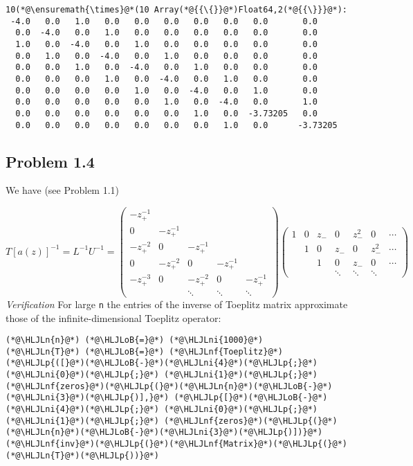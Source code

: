 \documentclass[12pt,landscape]{article}
\newcommand{\HLJLn}[1]{#1}
\newcommand{\HLJLnf}[1]{\textcolor[RGB]{66,102,213}{#1}}
\newcommand{\HLJLni}[1]{\textcolor[RGB]{59,151,46}{#1}}
\newcommand{\HLJLoB}[1]{\textcolor[RGB]{102,102,102}{\textbf{#1}}}
\newcommand{\HLJLp}[1]{#1}
\def\sopmatrix#1{ \begin{pmatrix}#1\end{pmatrix} }
\begin{document}
{\begin{lstlisting}
10(*@\ensuremath{\times}@*(10 Array(*@{{\{}}@*)Float64,2(*@{{\}}}@*):
 -4.0   0.0   1.0   0.0   0.0   0.0   0.0   0.0   0.0       0.0
  0.0  -4.0   0.0   1.0   0.0   0.0   0.0   0.0   0.0       0.0
  1.0   0.0  -4.0   0.0   1.0   0.0   0.0   0.0   0.0       0.0
  0.0   1.0   0.0  -4.0   0.0   1.0   0.0   0.0   0.0       0.0
  0.0   0.0   1.0   0.0  -4.0   0.0   1.0   0.0   0.0       0.0
  0.0   0.0   0.0   1.0   0.0  -4.0   0.0   1.0   0.0       0.0
  0.0   0.0   0.0   0.0   1.0   0.0  -4.0   0.0   1.0       0.0
  0.0   0.0   0.0   0.0   0.0   1.0   0.0  -4.0   0.0       1.0
  0.0   0.0   0.0   0.0   0.0   0.0   1.0   0.0  -3.73205   0.0
  0.0   0.0   0.0   0.0   0.0   0.0   0.0   1.0   0.0      -3.73205
\end{lstlisting}


\subsection{Problem 1.4}
We have (see Problem 1.1)

\[
T[a(z)]^{-1} = L^{-1} U^{-1} =
\sopmatrix{-z_+^{-1} \\
0 & -z_+^{-1} \\
-z_+^{-2} & 0 & -z_+^{-1} \\
0 & -z_+^{-2} & 0 & -z_+^{-1} \\
-z_+^{-3} & 0 & -z_+^{-2} & 0 & -z_+^{-1} \\
&&\ddots & \ddots & \ddots
}
\sopmatrix{
1 & 0 & z_- & 0 &z_-^2 & 0 & \cdots \\
& 1 & 0 & z_- & 0 &z_-^2 & \cdots \\
& & 1 & 0 & z_- & 0 & \cdots \\
&&&\ddots & \ddots & \ddots
}
\]
\emph{Verification} For large \texttt{n} the entries of the inverse of Toeplitz matrix approximate those of the infinite-dimensional Toeplitz operator:


\begin{lstlisting}
(*@\HLJLn{n}@*) (*@\HLJLoB{=}@*) (*@\HLJLni{1000}@*)
(*@\HLJLn{T}@*) (*@\HLJLoB{=}@*) (*@\HLJLnf{Toeplitz}@*)(*@\HLJLp{([}@*)(*@\HLJLoB{-}@*)(*@\HLJLni{4}@*)(*@\HLJLp{;}@*) (*@\HLJLni{0}@*)(*@\HLJLp{;}@*) (*@\HLJLni{1}@*)(*@\HLJLp{;}@*) (*@\HLJLnf{zeros}@*)(*@\HLJLp{(}@*)(*@\HLJLn{n}@*)(*@\HLJLoB{-}@*)(*@\HLJLni{3}@*)(*@\HLJLp{)],}@*) (*@\HLJLp{[}@*)(*@\HLJLoB{-}@*)(*@\HLJLni{4}@*)(*@\HLJLp{;}@*) (*@\HLJLni{0}@*)(*@\HLJLp{;}@*) (*@\HLJLni{1}@*)(*@\HLJLp{;}@*) (*@\HLJLnf{zeros}@*)(*@\HLJLp{(}@*)(*@\HLJLn{n}@*)(*@\HLJLoB{-}@*)(*@\HLJLni{3}@*)(*@\HLJLp{)])}@*)
(*@\HLJLnf{inv}@*)(*@\HLJLp{(}@*)(*@\HLJLnf{Matrix}@*)(*@\HLJLp{(}@*)(*@\HLJLn{T}@*)(*@\HLJLp{))}@*)
\end{lstlisting}

}
\end{document}
